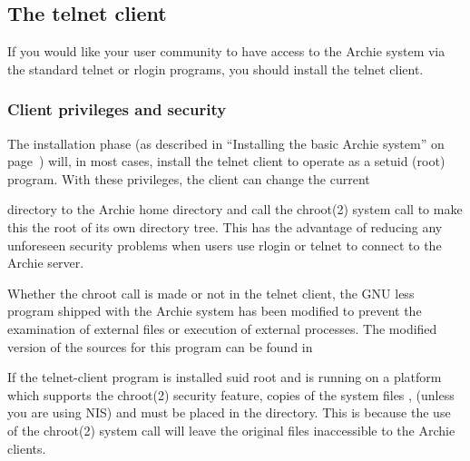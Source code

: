 \subsection{The telnet client}

If you would like your user community to have access to the Archie system via
the standard telnet or rlogin programs, you should install the telnet client.

\subsubsection{Client privileges and security}

The installation phase (as described in ``Installing the basic Archie system''
on page~\pageref{chap:install}) will, in most cases, install the telnet client to operate as a
setuid (root) program. With these privileges, the client can change the
current

directory to the Archie home directory and call the chroot(2) system call to
make this the root of its own directory tree. This has the advantage of
reducing any unforeseen security problems when users use rlogin or telnet to
connect to the Archie server.



Whether the chroot call is made or not in the telnet client, the GNU less
program shipped with the Archie system has been modified to prevent the
examination of external files or execution of external processes. The modified
version of the sources for this program can be found in 









If the telnet-client program is installed suid root and is running on a
platform which supports the chroot(2) security feature, copies of the system
files , 
(unless you are using NIS) and
 must be placed in the  directory. This is because the
use of the chroot(2) system call will leave the original files inaccessible to
the Archie clients.





